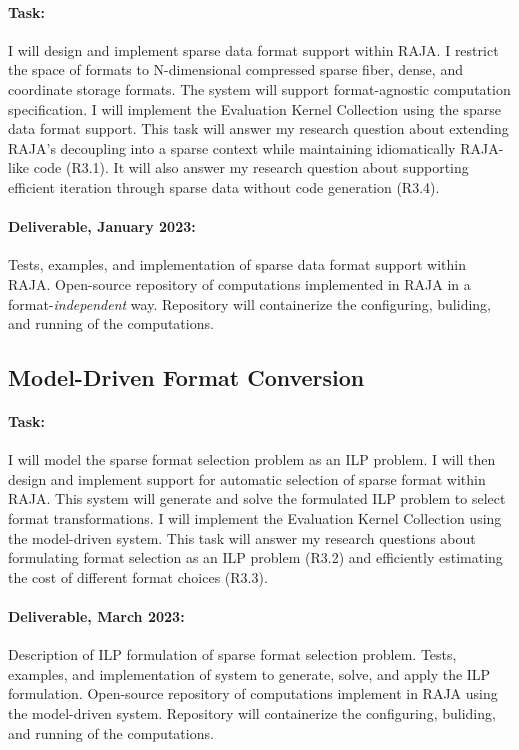 \documentclass{article}
\begin{document}
\paragraph{Task:} 
I will design and implement sparse data format support within RAJA. 
I restrict the space of formats to N-dimensional compressed sparse fiber, dense, and coordinate storage formats.
The system will support format-agnostic computation specification.
I will implement the Evaluation Kernel Collection using the sparse data format support.
This task will answer my research question about extending RAJA's decoupling into a sparse context while maintaining idiomatically RAJA-like code (R3.1).
It will also answer my research question about supporting efficient iteration through sparse data without code generation (R3.4). 

\paragraph{Deliverable, January 2023:} 
Tests, examples, and implementation of sparse data format support within RAJA. 
Open-source repository of computations implemented in RAJA in a format-\textit{independent} way.
Repository will containerize the configuring, buliding, and running of the computations. 

\subsection{Model-Driven Format Conversion}

\paragraph{Task:}
I will model the sparse format selection problem as an ILP problem.
I will then design and implement support for automatic selection of sparse format within RAJA.
This system will generate and solve the formulated ILP problem to select format transformations.
I will implement the Evaluation Kernel Collection using the model-driven system.
This task will answer my research questions about formulating format selection as an ILP problem (R3.2) and efficiently estimating the cost of different format choices (R3.3).

\paragraph{Deliverable, March 2023:}
Description of ILP formulation of sparse format selection problem.
Tests, examples, and implementation of system to generate, solve, and apply the ILP formulation.
Open-source repository of computations implement in RAJA using the model-driven system.
Repository will containerize the configuring, buliding, and running of the computations. 
\end{document}

